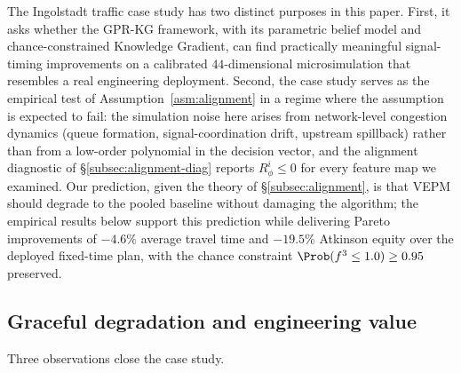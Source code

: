 

The Ingolstadt traffic case study has two distinct purposes in this paper.
First, it asks whether the GPR-KG framework, with its parametric belief
model and chance-constrained Knowledge Gradient, can find practically
meaningful signal-timing improvements on a calibrated $44$-dimensional
microsimulation that resembles a real engineering deployment.  Second,
the case study serves as the empirical test of
Assumption~\ref{asm:alignment} in a regime where the assumption is
expected to fail: the simulation noise here arises from network-level
congestion dynamics (queue formation, signal-coordination drift,
upstream spillback) rather than from a low-order polynomial in the
decision vector, and the alignment diagnostic
of \S\ref{subsec:alignment-diag} reports $R_\phi^{i}\le 0$ for every
feature map we examined.  Our prediction, given the theory of
\S\ref{subsec:alignment}, is that VEPM should degrade to the pooled
baseline without damaging the algorithm; the empirical results below
support this prediction while delivering Pareto improvements of $-4.6\%$
average travel time and $-19.5\%$ Atkinson equity over the deployed
fixed-time plan, with the chance constraint $\Prob(f^{3}\le 1.0)\ge 0.95$
preserved.



\subsection{Graceful degradation and engineering value}
\label{subsec:case-graceful-degradation}

Three observations close the case study.

